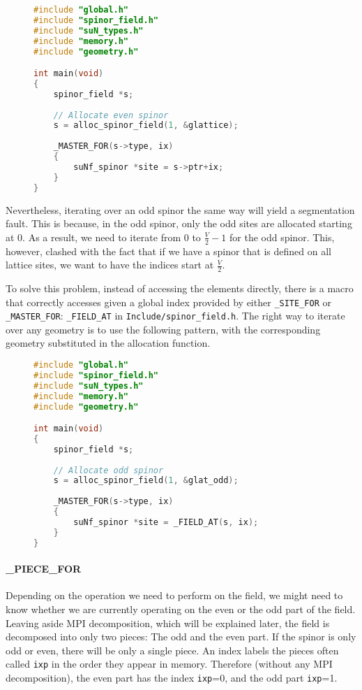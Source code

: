 \documentclass[12pt]{article}
\begin{document}
\begin{figure}[H]
\begin{lstlisting}[caption=To iterate over an even spinor is easy,language=C]
#include "global.h"
#include "spinor_field.h"
#include "suN_types.h"
#include "memory.h"
#include "geometry.h"

int main(void) 
{
    spinor_field *s;
    
    // Allocate even spinor
    s = alloc_spinor_field(1, &glattice);
    
    _MASTER_FOR(s->type, ix) 
    {
        suNf_spinor *site = s->ptr+ix;
    }
}
\end{lstlisting}
\end{figure}
Nevertheless, iterating over an odd spinor the same way will yield a segmentation fault. This is because, in the odd spinor, only the odd sites are allocated starting at 0. As a result, we need to iterate from 0 to $\tfrac{V}{2}-1$ for the odd spinor. This, however, clashed with the fact that if we have a spinor that is defined on all lattice sites, we want to have the indices start at $\tfrac{V}{2}$. \par
To solve this problem, instead of accessing the elements directly, there is a macro that correctly accesses given a global index provided by either \texttt{\_SITE\_FOR} or \texttt{\_MASTER\_FOR}: \texttt{\_FIELD\_AT} in \texttt{Include/spinor\_field.h}.
The right way to iterate over any geometry is to use the following pattern, with the corresponding geometry substituted in the allocation function.

\begin{figure}[H]
\begin{lstlisting}[caption=The right way to iterate over a spinor field,language=C] 
#include "global.h"
#include "spinor_field.h"
#include "suN_types.h"
#include "memory.h"
#include "geometry.h"

int main(void) 
{
    spinor_field *s;
    
    // Allocate odd spinor
    s = alloc_spinor_field(1, &glat_odd);
    
    _MASTER_FOR(s->type, ix) 
    {
        suNf_spinor *site = _FIELD_AT(s, ix);
    }
}
\end{lstlisting}
\end{figure}

\paragraph{\_PIECE\_FOR} Depending on the operation we need to perform on the field, we might need to know whether we are currently operating on the even or the odd part of the field. Leaving aside MPI decomposition, which will be explained later, the field is decomposed into only two pieces: The odd and the even part. If the spinor is only odd or even, there will be only a single piece. An index labels the pieces often called \texttt{ixp} in the order they appear in memory. Therefore (without any MPI decomposition), the even part has the index \texttt{ixp}=0, and the odd part \texttt{ixp}=1. 
\end{document}
